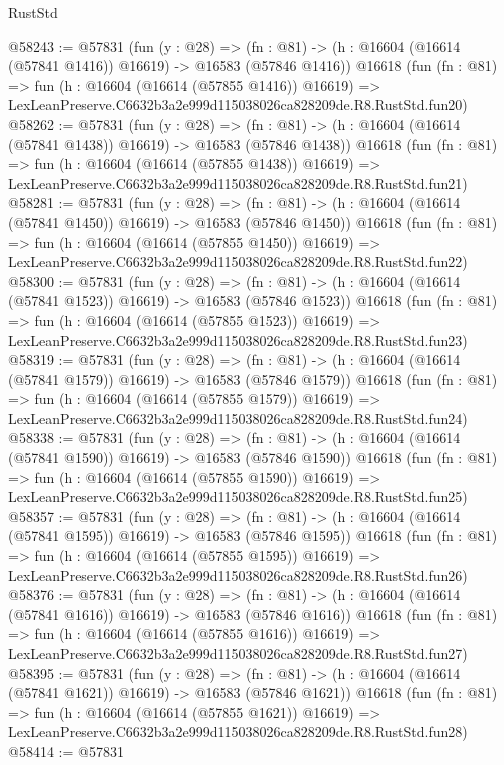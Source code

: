 \begin{lexlean}{RustStd}
\begin{coremodule}
@58243 := @57831
    (fun (y : @28) =>
    (fn : @81) -> (h : @16604 (@16614 (@57841 @1416)) @16619) -> @16583 (@57846 @1416))
    @16618
    (fun (fn : @81) =>
    fun (h : @16604 (@16614 (@57855 @1416)) @16619) =>
    LexLeanPreserve.C6632b3a2e999d115038026ca828209de.R8.RustStd.fun20)
@58262 := @57831
    (fun (y : @28) =>
    (fn : @81) -> (h : @16604 (@16614 (@57841 @1438)) @16619) -> @16583 (@57846 @1438))
    @16618
    (fun (fn : @81) =>
    fun (h : @16604 (@16614 (@57855 @1438)) @16619) =>
    LexLeanPreserve.C6632b3a2e999d115038026ca828209de.R8.RustStd.fun21)
@58281 := @57831
    (fun (y : @28) =>
    (fn : @81) -> (h : @16604 (@16614 (@57841 @1450)) @16619) -> @16583 (@57846 @1450))
    @16618
    (fun (fn : @81) =>
    fun (h : @16604 (@16614 (@57855 @1450)) @16619) =>
    LexLeanPreserve.C6632b3a2e999d115038026ca828209de.R8.RustStd.fun22)
@58300 := @57831
    (fun (y : @28) =>
    (fn : @81) -> (h : @16604 (@16614 (@57841 @1523)) @16619) -> @16583 (@57846 @1523))
    @16618
    (fun (fn : @81) =>
    fun (h : @16604 (@16614 (@57855 @1523)) @16619) =>
    LexLeanPreserve.C6632b3a2e999d115038026ca828209de.R8.RustStd.fun23)
@58319 := @57831
    (fun (y : @28) =>
    (fn : @81) -> (h : @16604 (@16614 (@57841 @1579)) @16619) -> @16583 (@57846 @1579))
    @16618
    (fun (fn : @81) =>
    fun (h : @16604 (@16614 (@57855 @1579)) @16619) =>
    LexLeanPreserve.C6632b3a2e999d115038026ca828209de.R8.RustStd.fun24)
@58338 := @57831
    (fun (y : @28) =>
    (fn : @81) -> (h : @16604 (@16614 (@57841 @1590)) @16619) -> @16583 (@57846 @1590))
    @16618
    (fun (fn : @81) =>
    fun (h : @16604 (@16614 (@57855 @1590)) @16619) =>
    LexLeanPreserve.C6632b3a2e999d115038026ca828209de.R8.RustStd.fun25)
@58357 := @57831
    (fun (y : @28) =>
    (fn : @81) -> (h : @16604 (@16614 (@57841 @1595)) @16619) -> @16583 (@57846 @1595))
    @16618
    (fun (fn : @81) =>
    fun (h : @16604 (@16614 (@57855 @1595)) @16619) =>
    LexLeanPreserve.C6632b3a2e999d115038026ca828209de.R8.RustStd.fun26)
@58376 := @57831
    (fun (y : @28) =>
    (fn : @81) -> (h : @16604 (@16614 (@57841 @1616)) @16619) -> @16583 (@57846 @1616))
    @16618
    (fun (fn : @81) =>
    fun (h : @16604 (@16614 (@57855 @1616)) @16619) =>
    LexLeanPreserve.C6632b3a2e999d115038026ca828209de.R8.RustStd.fun27)
@58395 := @57831
    (fun (y : @28) =>
    (fn : @81) -> (h : @16604 (@16614 (@57841 @1621)) @16619) -> @16583 (@57846 @1621))
    @16618
    (fun (fn : @81) =>
    fun (h : @16604 (@16614 (@57855 @1621)) @16619) =>
    LexLeanPreserve.C6632b3a2e999d115038026ca828209de.R8.RustStd.fun28)
@58414 := @57831

\end{coremodule}
\end{lexlean}

